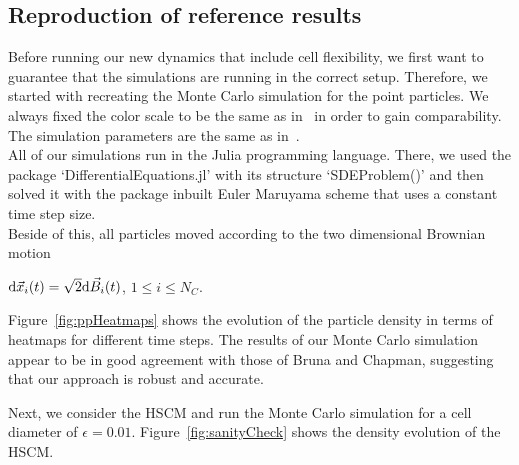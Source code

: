 \subsection{Reproduction of reference results}
Before running our new dynamics that include cell flexibility, we first want to guarantee that the simulations are running in the correct setup.
Therefore, we started with recreating the Monte Carlo simulation for the point particles. 
We always fixed the color scale to be the same as in~\cite{Bruna2012} in order to gain comparability. 
The simulation parameters are the same as in~\cite{Bruna2012}. \\
All of our simulations run in the Julia programming language. 
There, we used the package `DifferentialEquations.jl' with its structure `SDEProblem()' and then solved it with the package inbuilt Euler Maruyama scheme that uses a constant time step size. \\
Beside of this, all particles moved according to the two dimensional Brownian motion
\begin{center}
		$ \mathrm{d} \vec{x}_i(t) = \sqrt{2} \mathrm{d} \vec{B}_i(t)$, \hspace{0.5em} $1 \leq i \leq N_{C}$.
\end{center}
Figure~\ref{fig:ppHeatmaps} shows the evolution of the particle density in terms of heatmaps for different time steps. 
The results of our Monte Carlo simulation appear to be in good agreement with those of Bruna and Chapman, suggesting that our approach is robust and accurate.

Next, we consider the HSCM and run the Monte Carlo simulation for a cell diameter of $\epsilon = 0.01$. 
Figure~\ref{fig:sanityCheck} shows the density evolution of the HSCM.

